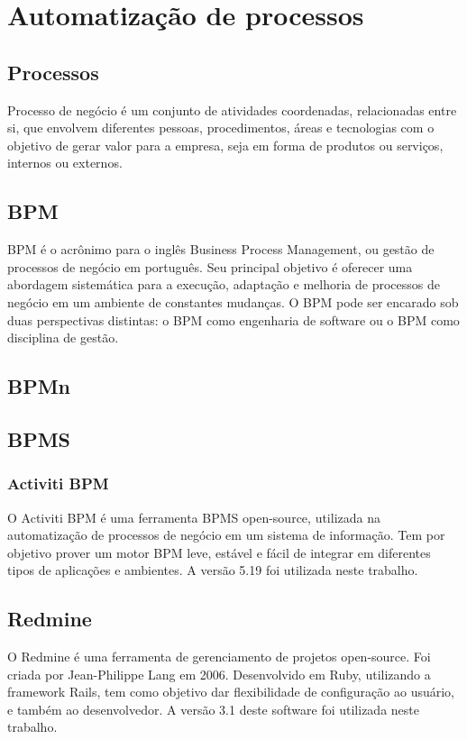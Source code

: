 \chapter{Automatização de processos}\label{chp:conceitos_basicos}


\section{Processos}\label{sec:conceitos_basicos-processos}
Processo de negócio é um conjunto de atividades coordenadas, relacionadas entre si, que envolvem diferentes pessoas, procedimentos, áreas e tecnologias com o objetivo de gerar valor para a empresa, seja em forma de produtos ou serviços, internos ou externos.

\section{BPM}\label{sec:conceitos_basicos-bpm}
BPM é o acrônimo para o inglês Business Process Management, ou gestão de processos de negócio em português. Seu principal objetivo é oferecer uma abordagem sistemática para a execução, adaptação e melhoria de processos de negócio em um ambiente de constantes mudanças. O BPM pode ser encarado sob duas perspectivas distintas: o BPM como engenharia de software ou o BPM como disciplina de gestão.

\section{BPMn}\label{sec:automatizacao-processos-bpmn}

\section{BPMS}\label{sec:automatizacao-processos-bpms}
\subsection{Activiti BPM}\label{sec:automatizacao-processos-bpms-activiti}

O Activiti BPM é uma ferramenta BPMS open-source, utilizada na automatização de processos de negócio em um sistema de informação. Tem por objetivo prover um motor BPM leve, estável e fácil de integrar em diferentes tipos de aplicações e ambientes. A versão 5.19 foi utilizada neste trabalho.



\section{Redmine}\label{sec:conceitos_basicos-redmine}
O Redmine\cite{redmine} é uma ferramenta de gerenciamento de projetos open-source. Foi criada por Jean-Philippe Lang em 2006. Desenvolvido em Ruby, utilizando a framework Rails, tem como objetivo dar flexibilidade de configuração ao usuário, e também ao desenvolvedor. A versão 3.1 deste software foi utilizada neste trabalho.


